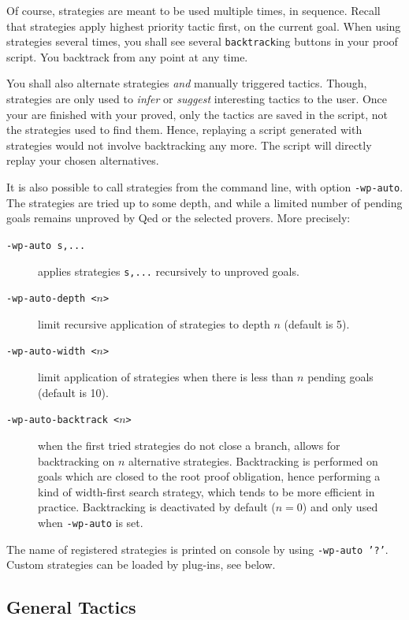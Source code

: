 Of course, strategies are meant to be used multiple times, in sequence. Recall that strategies apply highest priority tactic first, on the current goal. When using strategies several times, you shall see several \texttt{backtrack}ing buttons in your proof script. You backtrack from any point at any time.

You shall also alternate strategies \emph{and} manually triggered tactics. Though, strategies are only used to
\emph{infer} or \emph{suggest} interesting tactics to the user. Once your are finished with your proved, only the tactics are saved in the script, not the strategies used to find them. Hence, replaying a script generated with strategies would not involve backtracking any more. The script will directly replay your chosen alternatives.

It is also possible to call strategies from the command line, with option \texttt{-wp-auto}. The strategies are tried up to some depth, and while a limited number of pending goals
remains unproved by \textsf{Qed} or the selected provers. More precisely:
\begin{description}
\item[\tt -wp-auto s,...] applies strategies \texttt{s,...} recursively to unproved goals.
\item[\tt -wp-auto-depth <$n$>] limit recursive application of strategies to depth $n$ (default is 5).
\item[\tt -wp-auto-width <$n$>] limit application of strategies when there is less than $n$ pending goals (default is 10).
\item[\tt -wp-auto-backtrack <$n$>] when the first tried strategies do not close a branch, allows for backtracking
  on $n$ alternative strategies. Backtracking is performed on goals which are closed to the root proof obligation, hence
  performing a kind of width-first search strategy, which tends to be more efficient in practice.
  Backtracking is deactivated by default ($n=0$) and only used when \verb+-wp-auto+ is set.
\end{description}

The name of registered strategies is printed on console by using \texttt{-wp-auto '?'}. Custom strategies can be loaded by plug-ins, see below.

\newcommand{\TACTIC}[2]{#1\quad\quad\triangleright\quad\quad#2}

\subsection{General Tactics}

